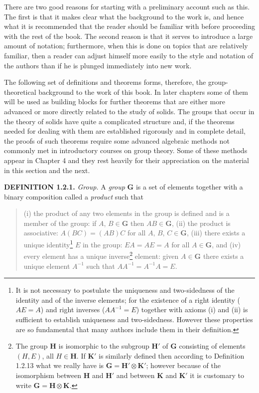 \documentclass[11pt,a4paper,twoside,openright]{book}
\begin{document}
There are two good reasons for starting with a preliminary account such as this. The first is that it makes clear what the background to the work is, and hence what it is recommended that the reader should be familiar with before proceeding with the rest of the book. The second reason is that it serves to introduce a large amount of notation; furthermore, when this is done on topics that are relatively familiar, then a reader can adjust himself more easily to the style and notation of the authors than if he is plunged immediately into new work.

The following set of definitions and theorems forms, therefore, the group-theoretical background to the work of this book. In later chapters some of them will be used as building blocks for further theorems that are either more advanced or more directly related to the study of solids. The groups that occur in the theory of solids have quite a complicated structure and, if the theorems needed for dealing with them are established rigorously and in complete detail, the proofs of such theorems require some advanced algebraic methods not commonly met in introductory courses on group theory. Some of these methods appear in Chapter 4 and they rest heavily for their appreciation on the material in this section and the next.

\textbf{DEFINITION 1.2.1.} \textit{Group.} A \textit{group} $\mathbf{G}$ is a set of elements together with a binary composition called a \textit{product} such that

\begin{quote}(i) the product of any two elements in the group is defined and is a member of the group: if $A$, $B \in \mathbf{G}$ then $AB \in \mathbf{G}$, (ii) the product is associative: $A(BC) = (AB)C$ for all $A$, $B$, $C \in \mathbf{G}$, (iii) there exists a unique identity\footnote{It is not necessary to postulate the uniqueness and two-sidedness of the identity and of the inverse elements; for the existence of a right identity ($AE = A$) and right inverses ($AA^{-1} = E$) together with axioms (i) and (ii) is sufficient to establish uniqueness and two-sidedness. However these properties are so fundamental that many authors include them in their definition.} $E$ in the group: $EA = AE = A$ for all $A \in \mathbf{G}$, and (iv) every element has a unique inverse\footnote{The group $\mathbf{H}$ is isomorphic to the subgroup $\mathbf{H}'$ of $\mathbf{G}$ consisting of elements $(H, E)$, all $H \in \mathbf{H}$. If $\mathbf{K}'$ is similarly defined then according to Definition 1.2.13 what we really have is $\mathbf{G} = \mathbf{H}' \otimes \mathbf{K}'$; however because of the isomorphism between $\mathbf{H}$ and $\mathbf{H}'$ and between $\mathbf{K}$ and $\mathbf{K}'$ it is customary to write $\mathbf{G} = \mathbf{H} \otimes \mathbf{K}$.} element: given $A \in \mathbf{G}$ there exists a unique element $A^{-1}$ such that $AA^{-1} = A^{-1}A = E$.\end{quote}
\end{document}
